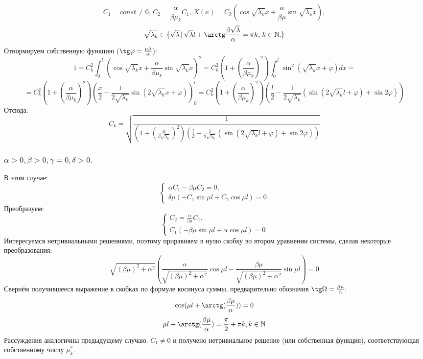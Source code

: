 \documentclass[12pt, a4paper]{article}
\begin{document}
\[ C_{1} = const \ne 0, \, C_{2} = \frac{\alpha}{\beta \mu_{k}} C_{1}, \, X(x) = C_{k} (\cos \sqrt{\lambda_{k}} x + \frac{\alpha}{\beta \mu} \sin \sqrt{\lambda_{k}} x), \]
\[ \sqrt{\lambda_{k}} \in \{ \sqrt{\lambda} \, | \, \sqrt{\lambda} l + \arctg \frac{\beta \sqrt{\lambda}}{\alpha} = \pi k, \, k \in \mathbb{N}. \} \]
Отнормируем собственную функцию ($\tg \varphi = \frac{\mu \beta}{\alpha}$):
\[ 1 = C_{k}^2 \int_{0}^{l} (\cos \sqrt{\lambda_{k}} x + \frac{\alpha}{\beta \mu_{k}} \sin \sqrt{\lambda_{k}} x)^2 = C_{k}^2 (1 + (\frac{\alpha}{\beta \mu_{k}})^2) \int_{0}^{l} \sin^2 (\sqrt{\lambda_{k}}x + \varphi) dx = \]
\[ = C_{k}^2 (1 + (\frac{\alpha}{\beta \mu_{k}})^2) (\frac{x}{2} - \frac{1}{2\sqrt{\lambda_{k}}} \sin (2\sqrt{\lambda_{k}}x + \varphi))_{0}^{l} = C_{k}^2 (1 + (\frac{\alpha}{\beta \mu_{k}})^2) (\frac{l}{2} - \frac{1}{2\sqrt{\lambda_{k}}} (\sin (2\sqrt{\lambda_{k}}l + \varphi) + \sin 2\varphi))\]
Отсюда:
\[ C_{k} = \sqrt{\frac{1}{(1 + (\frac{\alpha}{\beta \sqrt{\lambda_{k}}})^2) (\frac{l}{2} - \frac{1}{2\sqrt{\lambda_{k}}} (\sin (2\sqrt{\lambda_{k}}l + \varphi) + \sin 2\varphi))}} \]

\subsubsection{ $ \alpha > 0, \beta > 0, \gamma = 0, \delta > 0. $}
В этом случае:
\begin{displaymath}
	\begin{cases}
		\alpha C_{1} - \beta \mu C_{2} = 0, \\
		\delta \mu ( -C_{1} \sin \mu l + C_{2} \cos \mu l) = 0
	\end{cases}
\end{displaymath}
Преобразуем:
\begin{displaymath}
	\begin{cases}
		C_{2} = \frac{\alpha}{\beta \mu} C_{1}, \\
		C_{1} ( - \beta \mu\sin \mu l +\alpha \cos \mu l) = 0
	\end{cases}
\end{displaymath}
Интересуемся нетривиальными решениями, поэтому приравняем в нулю скобку во втором уравнении системы, сделав некоторые преобразования:
\[ \sqrt{(\beta \mu)^2 + \alpha^2} (\frac{\alpha}{\sqrt{(\beta \mu)^2 + \alpha^2}} \cos \mu l - \frac{\beta \mu}{\sqrt{(\beta \mu)^2 + \alpha^2}} \sin \mu l) = 0 \]
Свернём получившееся выражение в скобках по формуле косинуса суммы, предварительно обозначив $\tg \Omega = \frac{\beta \mu}{\alpha}$:
\[ \cos (\mu l + \arctg(\frac{\beta \mu}{\alpha})) = 0 \]
\[ \mu l + \arctg(\frac{\beta \mu}{\alpha}) = \frac{\pi}{2} + \pi k, k \in \mathbb{N} \]
Рассуждения аналогичны предыдущему случаю. $C_{1} \ne 0$ и получено нетривиальное решение (или собственная функция), соответствующая собственному числу $\mu ^{*}_{k}$.
\end{document}
